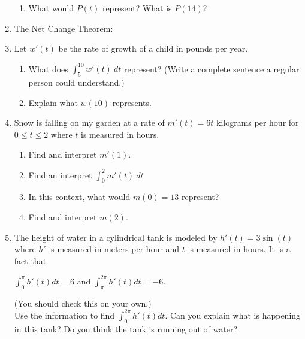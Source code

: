 \documentclass[11pt,fleqn]{article}
\begin{document}
\begin{enumerate}
\begin{enumerate}
\item What would $P(t)$ represent? What is $P(14)$?
\vfill
\end{enumerate}
\item The Net Change Theorem: 
\vspace{1in}
\newpage
\item Let $w'(t)$ be the rate of growth of a child in pounds per year.
	\begin{enumerate}
	\item What does $\displaystyle \int_5^{10} w'(t) \: dt$ represent? (Write a complete sentence a regular person could understand.)
	\vfill
	\item Explain what $w(10)$ represents.
	\vfill
	\end{enumerate}
\item Snow is falling on my garden at a rate of $m'(t) =6t$ kilograms per hour for $0\leq t \leq 2$ where $t$ is measured in hours. 
	\begin{enumerate}
	\item Find and interpret $m'(1).$
	\vfill
	\item Find an interpret $\displaystyle \int_0^2 m'(t) \: dt$
	\vfill
	\item In this context, what would $m(0)=13$ represent?
	\vfill
	\item Find and interpret $m(2).$
	\vfill
	\end{enumerate}
\item The height of water in a cylindrical tank is modeled by $h'(t)=3 \sin(t)$ where $h'$ is measured in meters per hour and $t$ is measured in hours. It is a fact that 
\begin{center} $\int_0^\pi h'(t) dt = 6$ and  $\int_\pi^{2\pi} h'(t) dt = -6.$ \end{center}
(You should check this on your own.)\\
Use the information to find $\int_0^{2\pi} h'(t) dt.$ Can you explain what is happening in this tank? Do you think the tank is running out of water?\\

\vfill
\end{enumerate}
\end{document}

